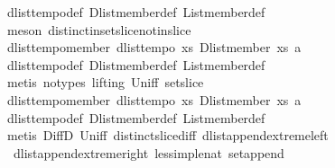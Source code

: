 \begin{isabellebody}
\ dlist{\isacharunderscore}tempo{}{\isacharunderscore}def\ Dlist{\isachardot}member{\isacharunderscore}def\ List{\isachardot}member{\isacharunderscore}def\isanewline
{}\isamarkupfalse%
\ {\isacharparenleft}meson\ distinct{\isacharunderscore}in{\isacharunderscore}set{\isacharunderscore}slice{}{\isacharunderscore}not{\isacharunderscore}in{\isacharunderscore}slice{}{\isacharparenright}%
\endisatagproof
{\isafoldproof}%
%
\isadelimproof
\isanewline
%
\endisadelimproof
\isanewline
{}\isamarkupfalse%
\ dlist{\isacharunderscore}tempo{}{\isacharunderscore}member{\isacharcolon}\ {\isachardoublequoteopen}dlist{\isacharunderscore}tempo{}\ {\isacharparenleft}{\isasymlambda}xs{\isachardot}\ Dlist{\isachardot}member\ xs\ a{\isacharparenright}{\isachardoublequoteclose}\isanewline
%
\isadelimproof
%
\endisadelimproof
%
\isatagproof
{}\isamarkupfalse%
\ dlist{\isacharunderscore}tempo{}{\isacharunderscore}def\ Dlist{\isachardot}member{\isacharunderscore}def\ List{\isachardot}member{\isacharunderscore}def\isanewline
{}\isamarkupfalse%
\ {\isacharparenleft}metis\ {\isacharparenleft}no{\isacharunderscore}types{\isacharcomma}\ lifting{\isacharparenright}\ Un{\isacharunderscore}iff\ set{\isacharunderscore}slice\ {\isacharparenright}%
\endisatagproof
{\isafoldproof}%
%
\isadelimproof
\isanewline
%
\endisadelimproof
\isanewline
{}\isamarkupfalse%
\ dlist{\isacharunderscore}tempo{}{\isacharunderscore}member{\isacharcolon}\ {\isachardoublequoteopen}dlist{\isacharunderscore}tempo{}\ {\isacharparenleft}{\isasymlambda}xs{\isachardot}\ Dlist{\isachardot}member\ xs\ a{\isacharparenright}{\isachardoublequoteclose}\isanewline
%
\isadelimproof
%
\endisadelimproof
%
\isatagproof
{}\isamarkupfalse%
\ dlist{\isacharunderscore}tempo{}{\isacharunderscore}def\ Dlist{\isachardot}member{\isacharunderscore}def\ List{\isachardot}member{\isacharunderscore}def\isanewline
{}\isamarkupfalse%
\ {\isacharparenleft}metis\ DiffD{}\ Un{\isacharunderscore}iff\ distinct{\isacharunderscore}slice{\isacharunderscore}diff{}\ dlist{\isacharunderscore}append{\isacharunderscore}extreme{\isacharunderscore}left\ \isanewline
\ \ dlist{\isacharunderscore}append{\isacharunderscore}extreme{\isacharunderscore}right\ less{\isacharunderscore}imp{\isacharunderscore}le{\isacharunderscore}nat\ set{\isacharunderscore}append{\isacharparenright}%
\endisatagproof
{\isafoldproof}%
%
\isadelimproof

\end{isabellebody}
